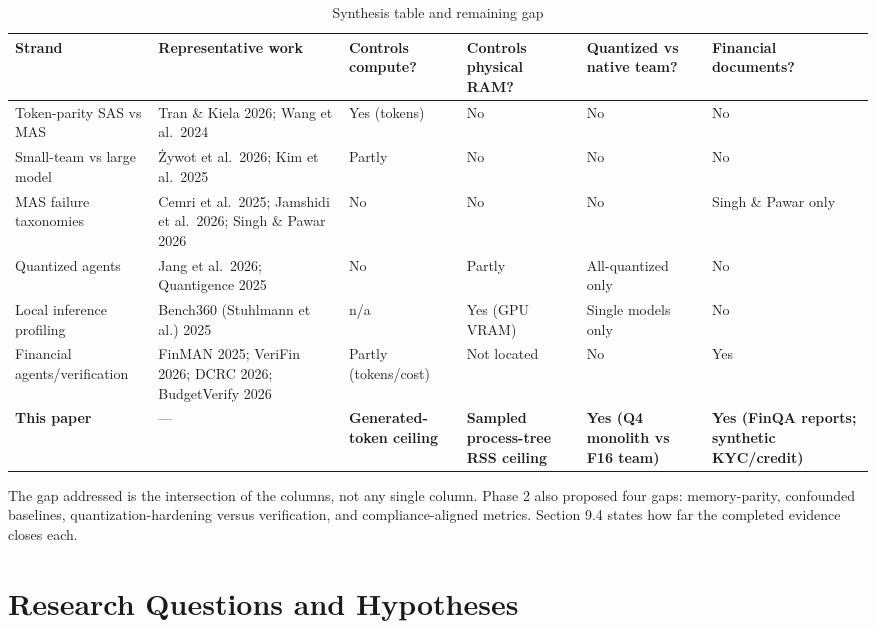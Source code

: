 \documentclass[letterpaper]{article}
\begin{document}
\begin{table}[tbp]
\centering
\setlength{\tabcolsep}{3pt}
\begin{tabular}{@{}>{\raggedright\arraybackslash}p{87.05pt}>{\raggedright\arraybackslash}p{99.33pt}>{\raggedright\arraybackslash}p{62.02pt}>{\raggedright\arraybackslash}p{73.15pt}>{\raggedright\arraybackslash}p{69.64pt}>{\raggedright\arraybackslash}p{82.80pt}@{}}
\toprule
\textbf{Strand} & \textbf{Representative work} & \textbf{Controls compute?} & \textbf{Controls physical RAM?} & \textbf{Quantized vs native team?} & \textbf{Financial documents?} \\
\midrule
Token-parity SAS vs MAS & Tran \& Kiela 2026; Wang et al. 2024 & Yes (tokens) & No & No & No \\
Small-team vs large model & Żywot et al. 2026; Kim et al. 2025 & Partly & No & No & No \\
MAS failure taxonomies & Cemri et al. 2025; Jamshidi et al. 2026; Singh \& Pawar 2026 & No & No & No & Singh \& Pawar only \\
Quantized agents & Jang et al. 2026; Quantigence 2025 & No & Partly & All-quantized only & No \\
Local inference profiling & Bench360 (Stuhlmann et al.) 2025 & n/a & Yes (GPU VRAM) & Single models only & No \\
Financial agents/verification & FinMAN 2025; VeriFin 2026; DCRC 2026; BudgetVerify 2026 & Partly (tokens/cost) & Not located & No & Yes \\
\textbf{This paper} & — & \textbf{Generated-token ceiling} & \textbf{Sampled process-tree RSS ceiling} & \textbf{Yes (Q4 monolith vs F16 team)} & \textbf{Yes (FinQA reports; synthetic KYC/credit)} \\
\bottomrule
\end{tabular}
\caption{Synthesis table and remaining gap}
\end{table}

The gap addressed is the intersection of the columns, not any single column. Phase 2 also proposed four gaps: memory-parity, confounded baselines, quantization-hardening versus verification, and compliance-aligned metrics. Section 9.4 states how far the completed evidence closes each.

\section{Research Questions and Hypotheses}\label{research-questions-and-hypotheses}
\end{document}
